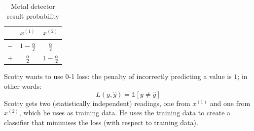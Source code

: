 \begin{table}[h]
    \centering
    \caption{Metal detector result probability}
    \begin{tabular}{||c|cc||}
    \hline
        ~ & $x^{(1)}$ & $x^{(2)}$ \\ \hline \hline
        $-$ & $1-\frac{\alpha}{2}$ & $\frac{\alpha}{2}$ \\ \hline
        $+$ & $\frac{\alpha}{2}$ & $1-\frac{\alpha}{2}$ \\ \hline
    \end{tabular}
\end{table}

Scotty wants to use 0-1 loss: the penalty of incorrectly predicting a value is $1$;  in other words: 
\[L(y,\hat{y}) = \mathds{1} [y \neq \hat{y}]\]
Scotty gets two (statistically independent) readings, one from $x^{(1)}$ and one from $x^{(2)}$, which he uses as training data. He uses the training data to create a classifier that minimises the loss (with respect to training data). \\
\\
